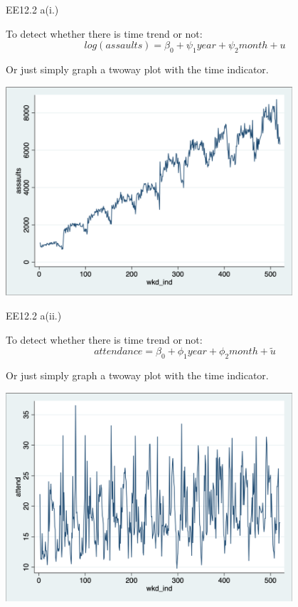 \begin{frame}[fragile]{EE12.2 a(i.)}

To detect whether there is time trend or not:
$$log(assaults) = \beta_0 + \psi_1 year + \psi_2 month + u$$

Or just simply graph a twoway plot with the time indicator.

\includegraphics[width=0.8\textwidth]{Images/L4-1_2.png}

\end{frame}


\begin{frame}[fragile]{EE12.2 a(ii.)}

To detect whether there is time trend or not:
$$attendance = \beta_0 + \phi_1 year + \phi_2 month+ \tilde{u}$$

Or just simply graph a twoway plot with the time indicator.

\includegraphics[width=0.8\textwidth]{Images/L4-1_3.png}

\end{frame}


